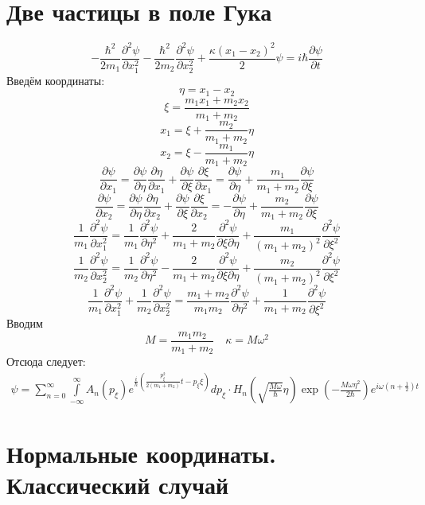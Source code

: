 \section{Две частицы в поле Гука}
\[
	- \frac{\hbar^2}{2 m_1} \frac{\partial^2 \psi}{\partial x_1^2} 
	- \frac{\hbar^2}{2 m_2} \frac{\partial^2 \psi}{\partial x_2^2}
	+ \frac{\kappa(x_1 - x_2)^2}{2}\psi =
	i\hbar \frac{\partial \psi}{\partial t}
\]
Введём координаты:
\[
	\eta = x_1 - x_2
\]
\[
	\xi = \frac{m_1 x_1 + m_2 x_2}{m_1 + m_2}
\]
\[
	x_1 = \xi + \frac{m_2}{m_1 + m_2} \eta
\]
\[
	x_2 = \xi - \frac{m_1}{m_1 + m_2} \eta
\]
\[
	\frac{\partial \psi}{\partial x_1} =
	\frac{\partial \psi}{\partial \eta} \frac{\partial \eta}{\partial x_1} +
	\frac{\partial \psi}{\partial \xi} \frac{\partial \xi}{\partial x_1} =
	\frac{\partial \psi}{\partial \eta} + \frac{m_1}{m_1 + m_2} \frac{\partial \psi}{\partial \xi}
\]
\[
	\frac{\partial \psi}{\partial x_2} =
	\frac{\partial \psi}{\partial \eta} \frac{\partial \eta}{\partial x_2} +
	\frac{\partial \psi}{\partial \xi} \frac{\partial \xi}{\partial x_2} =
	- \frac{\partial \psi}{\partial \eta} + \frac{m_2}{m_1 + m_2} \frac{\partial \psi}{\partial \xi}
\]
\[
	\frac{1}{m_1}\frac{\partial^2 \psi}{\partial x_1^2} =
	\frac{1}{m_1}\frac{\partial^2 \psi}{\partial \eta^2} + 
	\frac{2}{m_1 + m_2} \frac{\partial^2 \psi}{\partial \xi \partial \eta} +
	\frac{m_1}{(m_1 + m_2)^2} \frac{\partial^2 \psi}{\partial \xi^2}
\]
\[
	\frac{1}{m_2}\frac{\partial^2 \psi}{\partial x_2^2} =
	\frac{1}{m_2}\frac{\partial^2 \psi}{\partial \eta^2} - 
	\frac{2}{m_1 + m_2} \frac{\partial^2 \psi}{\partial \xi \partial \eta} +
	\frac{m_2}{(m_1 + m_2)^2} \frac{\partial^2 \psi}{\partial \xi^2}
\]
\[
	\frac{1}{m_1}\frac{\partial^2 \psi}{\partial x_1^2} +
	\frac{1}{m_2}\frac{\partial^2 \psi}{\partial x_2^2} =
	\frac{m_1 + m_2}{m_1 m_2} \frac{\partial^2 \psi}{\partial \eta^2} +
	\frac{1}{m_1 + m_2}\frac{\partial^2 \psi}{\partial \xi^2}
\]
Вводим
\[
	M = \frac{m_1 m_2}{m_1 + m_2} \quad \kappa = M \omega^2
\]
Отсюда следует:
\[
\begin{gathered}
	\psi =
	\sum_{n = 0}^{\infty} 
	\int\limits_{-\infty}^{\infty} A_n(p_\xi) e^{\frac{i}{\hbar}\left(\frac{p_\xi^2}{2(m_1 +m_2)} t - p_\xi \xi\right)} dp_\xi \cdot
	H_n \left( \sqrt{\frac{M\omega}{\hbar}} \eta\right)
	\exp \left(- \frac{M \omega \eta^2}{2\hbar}\right)
	e^{i\omega \left(n + \frac{1}{2}\right) t}
\end{gathered}
\]

\section{Нормальные координаты. Классический случай}

